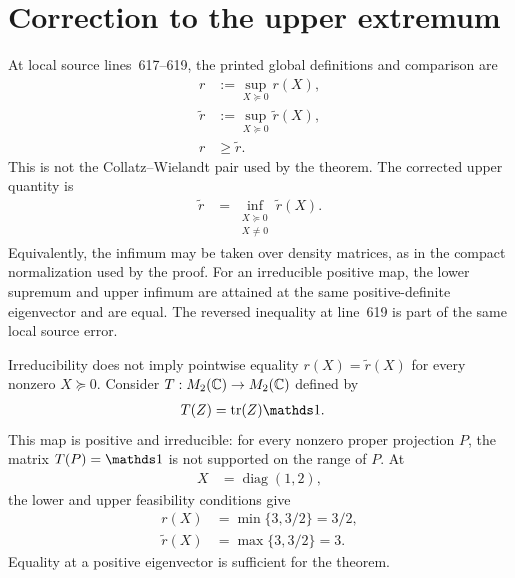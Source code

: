 \documentclass[11pt]{article}
\begin{document}
\section{Correction to the upper extremum}

At local source lines~617--619, the printed global definitions and comparison
are
\begin{align}
  r
    &:=\sup_{X\succeq0}r(X),
  \label{eq:wolf_thm6_3_positive_map_cp_scope_printed_lower_global}\\
  \widetilde r
    &:=\sup_{X\succeq0}\widetilde r(X),
  \label{eq:wolf_thm6_3_positive_map_cp_scope_printed_upper_global}\\
  r
    &\geq\widetilde r.
  \label{eq:wolf_thm6_3_positive_map_cp_scope_printed_global_order}
\end{align}
This is not the Collatz--Wielandt pair used by the theorem. The corrected upper
quantity is
\begin{align}
  \widetilde r
    &=\inf_{\substack{X\succeq0\\X\neq0}}\widetilde r(X).
  \label{eq:wolf_thm6_3_positive_map_cp_scope_corrected_upper_global}
\end{align}
Equivalently, the infimum may be taken over density matrices, as in the compact
normalization used by the proof. For an irreducible positive map, the lower
supremum and upper infimum are attained at the same positive-definite
eigenvector and are equal. The reversed inequality at line~619 is part of the
same local source error.

Irreducibility does not imply pointwise equality
$r(X)=\widetilde r(X)$ for every nonzero $X\succeq0$. Consider
$T:M_{2}(\mathbb{C})\to M_{2}(\mathbb{C})$ defined by
\begin{align}
  T(Z)
    &=\tr(Z)\Id.
  \label{eq:wolf_thm6_3_positive_map_cp_scope_trace_identity_map}
\end{align}
This map is positive and irreducible: for every nonzero proper projection $P$,
the matrix $T(P)=\Id$ is not supported on the range of $P$. At
\begin{align}
  X
    &=\operatorname{diag}(1,2),
  \label{eq:wolf_thm6_3_positive_map_cp_scope_pointwise_counterexample_matrix}
\end{align}
the lower and upper feasibility conditions give
\begin{align}
  r(X)
    &=\min\{3,3/2\}
     =3/2,
  \label{eq:wolf_thm6_3_positive_map_cp_scope_pointwise_lower_value}\\
  \widetilde r(X)
    &=\max\{3,3/2\}
     =3.
  \label{eq:wolf_thm6_3_positive_map_cp_scope_pointwise_upper_value}
\end{align}
Equality at a positive eigenvector is sufficient for the theorem.
\end{document}
